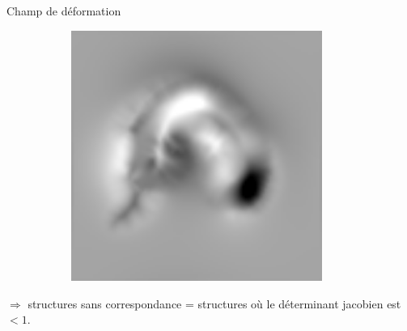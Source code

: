 \documentclass[10pt]{beamer}
\begin{document}
\begin{frame}{Champ de déformation}
\begin{figure}[ht]
\begin{subfigure}[t]{0.33\textwidth}
      \caption{}
      \label{subfig:field_variational}
    \end{subfigure}%
    \begin{subfigure}[t]{0.33\textwidth}
      \centering
      \includegraphics[width=0.9\textwidth]{fig/jacobien}
      \caption{}
      \label{subfig:jacobien}
    \end{subfigure}%

  \end{figure}
  \vspace{-0.3cm}
  $\Rightarrow$ structures sans correspondance = structures où le déterminant jacobien est $< 1$.

\end{frame}
\end{document}
